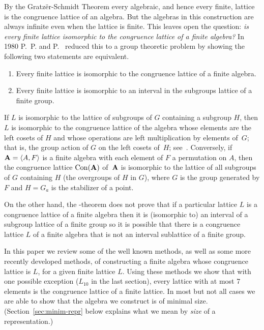 By the Gratz\"er-Schmidt Theorem every algebraic, and hence
every finite, lattice is the congruence lattice of an algebra. 
But the algebras in this construction are always infinite
even when the lattice is finite. This leaves open the question:
\emph{is every finite lattice isomorphic to the congruence
lattice of a finite algebra?} In 1980 P.~P. \Palfy and P.~\Pudlak
reduced this to a group theoretic problem by showing the following
two statements are equivalent.
\begin{enumerate}
\item
Every finite lattice is isomorphic to the congruence
lattice of a finite algebra.
\item
Every finite lattice is
isomorphic to an interval in the subgroups lattice of a finite 
group.
\end{enumerate}



If $L$ is isomorphic to the lattice of subgroups of $G$
containing a subgroup $H$, then $L$ is isomorphic to the congruence
lattice of the algebra whose elements are the left cosets of $H$
and whose operations are left multiplication by elements of~$G$;
that is, the group action of $G$ on the left cosets of~$H$;
see~\cite{Bergman2012,alvi:1987}. Conversely, if 
$\mathbf{A} = \langle A,F \rangle$  is a finite algebra with each element
of $F$ a permutation on $A$, then the congruence lattice 
$\operatorname{Con}(\mathbf{A})$ of~$\mathbf{A}$ is isomorphic to the lattice of all 
subgroups of $G$ containing $H$ (the overgroups of $H$ in $G$),
where $G$ is the group generated by $F$ and $H = G_a$ is the stabilizer of a point.

On the other hand, the
\Palfy-\Pudlak theorem does not prove that if 
a particular lattice $L$
is a congruence lattice of a finite algebra then it 
is (isomorphic to) an interval of a subgroup lattice of a finite
group so
it is possible that there is a congruence lattice $L$ of a finite
algebra that is not an interval sublattice of a finite group. 

In this paper we review some of the well known methods, as well as 
some more recently developed methods, of constructing a finite
algebra whose congruence lattice is $L$, for a given finite
lattice $L$. Using these methods we show that with one possible
exception ($L_{10}$ in the last section), every 
lattice with at most 7 elements is the 
congruence lattice of a finite lattice. In most but not all
cases we are able to show that the algebra we construct is 
of minimal size. (Section~\ref{sec:minim-repr} below explains what
we mean by \emph{size} of a representation.)

